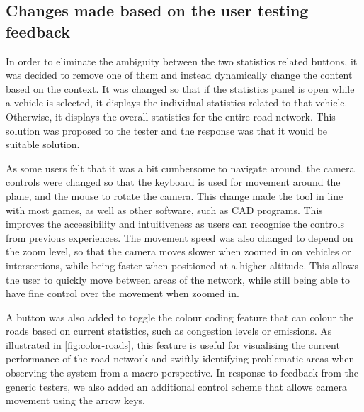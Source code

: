     \subsection{Changes made based on the user testing feedback}
        In order to eliminate the ambiguity between the two statistics related buttons, it was decided to remove one of them and instead dynamically change the content based on the context. It was changed so that if the statistics panel is open while a vehicle is selected, it displays the individual statistics related to that vehicle. Otherwise, it displays the overall statistics for the entire road network. This solution was proposed to the tester and the response was that it would be suitable solution.

        As some users felt that it was a bit cumbersome to navigate around, the camera controls were changed so that the keyboard is used for movement around the plane, and the mouse to rotate the camera. This change made the tool in line with most games, as well as other software, such as CAD programs. This improves the accessibility and intuitiveness as users can recognise the controls from previous experiences. The movement speed was also changed to depend on the zoom level, so that the camera moves slower when zoomed in on vehicles or intersections, while being faster when positioned at a higher altitude. This allows the user to quickly move between areas of the network, while still being able to have fine control over the movement when zoomed in.

        A button was also added to toggle the colour coding feature that can colour the roads based on current statistics, such as congestion levels or emissions. As illustrated in \ref{fig:color-roads}, this feature is useful for visualising the current performance of the road network and swiftly identifying problematic areas when observing the system from a macro perspective. In response to feedback from the generic testers, we also added an additional control scheme that allows camera movement using the arrow keys.
        
